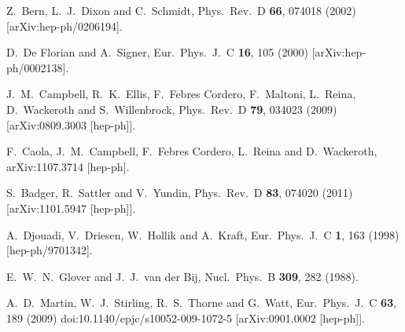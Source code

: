 \documentclass[12pt]{article}
\begin{document}
\begin{thebibliography}{99}
  Z.~Bern, L.~J.~Dixon and C.~Schmidt,
  Phys.\ Rev.\  D {\bf 66}, 074018 (2002)
  [arXiv:hep-ph/0206194].

  D.~De Florian and A.~Signer,
  Eur.\ Phys.\ J.\  C {\bf 16}, 105 (2000)
  [arXiv:hep-ph/0002138].

  J.~M.~Campbell, R.~K.~Ellis, F.~Febres Cordero, F.~Maltoni, L.~Reina, D.~Wackeroth and S.~Willenbrock,
  Phys.\ Rev.\  D {\bf 79}, 034023 (2009)
  [arXiv:0809.3003 [hep-ph]].
  
  F.~Caola, J.~M.~Campbell, F.~Febres Cordero, L.~Reina and D.~Wackeroth,
  arXiv:1107.3714 [hep-ph].

  S.~Badger, R.~Sattler and V.~Yundin,
  Phys.\ Rev.\  D {\bf 83}, 074020 (2011)
  [arXiv:1101.5947 [hep-ph]].

  A.~Djouadi, V.~Driesen, W.~Hollik and A.~Kraft,
  Eur.\ Phys.\ J.\ C {\bf 1}, 163 (1998)
  [hep-ph/9701342].

  E.~W.~N.~Glover and J.~J.~van der Bij,
  Nucl.\ Phys.\ B {\bf 309}, 282 (1988).

  A.~D.~Martin, W.~J.~Stirling, R.~S.~Thorne and G.~Watt,
  Eur.\ Phys.\ J.\ C {\bf 63}, 189 (2009)
  doi:10.1140/epjc/s10052-009-1072-5
  [arXiv:0901.0002 [hep-ph]].


\end{thebibliography}
\end{document}
